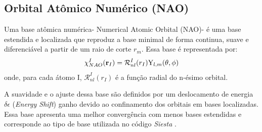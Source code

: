 %
%
%
\subsection{Orbital Atômico Numérico (NAO)}
Uma base atômica numérica- Numerical Atomic Orbital (NAO)-  é uma base estendida e localizada que reproduz a base minimal de forma continua, suave e diferenciável a partir de um raio de corte $r_m$. Essa base é representada por:
\begin{equation}
    \chi_{NAO}^I(\vb{r}_I)=\mathcal{R}^I_{nl}(r_I)\mathrm{Y}_{l,m}(\theta,\phi)
\end{equation}
onde, para cada átomo I, $\mathcal{R}^I_{nl}(r_I)$ é a função radial do n-ésimo orbital. 

A suavidade e o ajuste dessa base são definidos por um deslocamento de energia $\delta \epsilon$ (\textit{Energy Shift})  ganho devido ao confinamento dos orbitais em bases localizadas. Essa base apresenta uma melhor convergência com menos bases estendidas e corresponde ao tipo de base utilizada no código \textit{Siesta} \cite{nao}.

